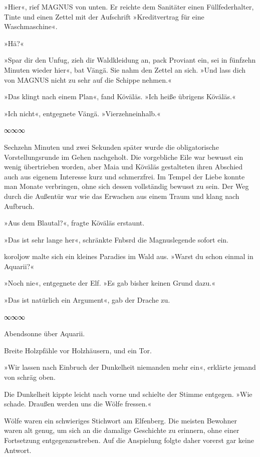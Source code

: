 »Hier«, rief MAGNUS von unten. Er reichte dem Sanitäter einen Füllfederhalter, Tinte und einen Zettel mit der Aufschrift »Kreditvertrag für eine Waschmaschine«.

»Hä?«

»Spar dir den Unfug, zieh dir Waldkleidung an, pack Proviant ein, sei in fünfzehn Minuten wieder hier«, bat Vängä. Sie nahm den Zettel an sich. »Und lass dich von MAGNUS nicht zu sehr auf die Schippe nehmen.«

»Das klingt nach einem Plan«, fand Köväläs. »Ich heiße übrigens Köväläs.«

»Ich nicht«, entgegnete Vängä. »Vierzehneinhalb.«

\begin{center}
∞∞∞
\end{center}

Sechzehn Minuten und zwei Sekunden später wurde die obligatorische Vorstellungsrunde im Gehen nachgeholt. Die vorgebliche Eile war bewusst ein wenig übertrieben worden, aber Maia und Köväläs gestalteten ihren Abschied auch aus eigenem Interesse kurz und schmerzfrei. Im Tempel der Liebe konnte man Monate verbringen, ohne sich dessen vollständig bewusst zu sein. Der Weg durch die Außentür war wie das Erwachen aus einem Traum und klang nach Aufbruch.

»Aus dem Blautal?«, fragte Köväläs erstaunt.

»Das ist sehr lange her«, schränkte Fnbsrd die Magnuslegende sofort ein.

koroljow malte sich ein kleines Paradies im Wald aus. »Warst du schon einmal in Aquarii?«

»Noch nie«, entgegnete der Elf. »Es gab bisher keinen Grund dazu.«

»Das ist natürlich ein Argument«, gab der Drache zu.

\begin{center}
∞∞∞
\end{center}

Abendsonne über Aquarii.

Breite Holzpfähle vor Holzhäusern, und ein Tor.

»Wir lassen nach Einbruch der Dunkelheit niemanden mehr ein«, erklärte jemand von schräg oben.

Die Dunkelheit kippte leicht nach vorne und schielte der Stimme entgegen. »Wie schade. Draußen werden uns die Wölfe fressen.«

Wölfe waren ein schwieriges Stichwort am Elfenberg. Die meisten Bewohner waren alt genug, um sich an die damalige Geschichte zu erinnern, ohne einer Fortsetzung entgegenzustreben. Auf die Anspielung folgte daher vorerst gar keine Antwort.

